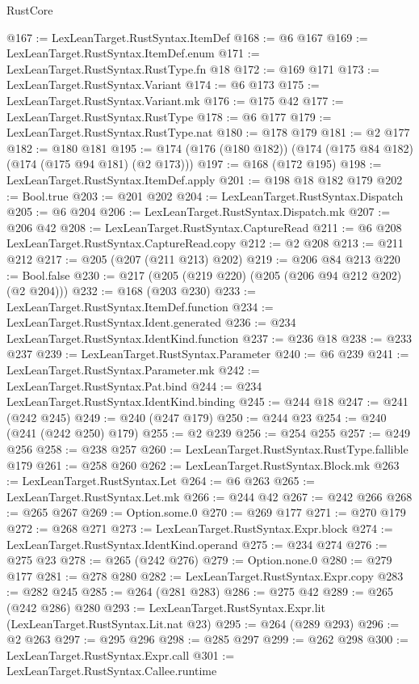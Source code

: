 \begin{lexlean}{RustCore}
\begin{coremodule}
@167 := LexLeanTarget.RustSyntax.ItemDef
@168 := @6 @167
@169 := LexLeanTarget.RustSyntax.ItemDef.enum
@171 := LexLeanTarget.RustSyntax.RustType.fn @18
@172 := @169 @171
@173 := LexLeanTarget.RustSyntax.Variant
@174 := @6 @173
@175 := LexLeanTarget.RustSyntax.Variant.mk
@176 := @175 @42
@177 := LexLeanTarget.RustSyntax.RustType
@178 := @6 @177
@179 := LexLeanTarget.RustSyntax.RustType.nat
@180 := @178 @179
@181 := @2 @177
@182 := @180 @181
@195 := @174 (@176 (@180 @182)) (@174 (@175 @84 @182) (@174 (@175 @94 @181) (@2 @173)))
@197 := @168 (@172 @195)
@198 := LexLeanTarget.RustSyntax.ItemDef.apply
@201 := @198 @18 @182 @179
@202 := Bool.true
@203 := @201 @202
@204 := LexLeanTarget.RustSyntax.Dispatch
@205 := @6 @204
@206 := LexLeanTarget.RustSyntax.Dispatch.mk
@207 := @206 @42
@208 := LexLeanTarget.RustSyntax.CaptureRead
@211 := @6 @208 LexLeanTarget.RustSyntax.CaptureRead.copy
@212 := @2 @208
@213 := @211 @212
@217 := @205 (@207 (@211 @213) @202)
@219 := @206 @84 @213
@220 := Bool.false
@230 := @217 (@205 (@219 @220) (@205 (@206 @94 @212 @202) (@2 @204)))
@232 := @168 (@203 @230)
@233 := LexLeanTarget.RustSyntax.ItemDef.function
@234 := LexLeanTarget.RustSyntax.Ident.generated
@236 := @234 LexLeanTarget.RustSyntax.IdentKind.function
@237 := @236 @18
@238 := @233 @237
@239 := LexLeanTarget.RustSyntax.Parameter
@240 := @6 @239
@241 := LexLeanTarget.RustSyntax.Parameter.mk
@242 := LexLeanTarget.RustSyntax.Pat.bind
@244 := @234 LexLeanTarget.RustSyntax.IdentKind.binding
@245 := @244 @18
@247 := @241 (@242 @245)
@249 := @240 (@247 @179)
@250 := @244 @23
@254 := @240 (@241 (@242 @250) @179)
@255 := @2 @239
@256 := @254 @255
@257 := @249 @256
@258 := @238 @257
@260 := LexLeanTarget.RustSyntax.RustType.fallible @179
@261 := @258 @260
@262 := LexLeanTarget.RustSyntax.Block.mk
@263 := LexLeanTarget.RustSyntax.Let
@264 := @6 @263
@265 := LexLeanTarget.RustSyntax.Let.mk
@266 := @244 @42
@267 := @242 @266
@268 := @265 @267
@269 := Option.some.{0}
@270 := @269 @177
@271 := @270 @179
@272 := @268 @271
@273 := LexLeanTarget.RustSyntax.Expr.block
@274 := LexLeanTarget.RustSyntax.IdentKind.operand
@275 := @234 @274
@276 := @275 @23
@278 := @265 (@242 @276)
@279 := Option.none.{0}
@280 := @279 @177
@281 := @278 @280
@282 := LexLeanTarget.RustSyntax.Expr.copy
@283 := @282 @245
@285 := @264 (@281 @283)
@286 := @275 @42
@289 := @265 (@242 @286) @280
@293 := LexLeanTarget.RustSyntax.Expr.lit (LexLeanTarget.RustSyntax.Lit.nat @23)
@295 := @264 (@289 @293)
@296 := @2 @263
@297 := @295 @296
@298 := @285 @297
@299 := @262 @298
@300 := LexLeanTarget.RustSyntax.Expr.call
@301 := LexLeanTarget.RustSyntax.Callee.runtime

\end{coremodule}
\end{lexlean}
